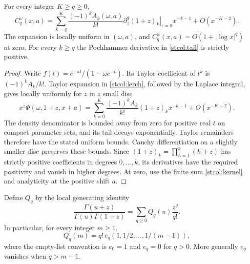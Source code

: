 \begin{lemma}\label{stcol:tail-lemma}
For every integer $K\ge q\ge0$,
\begin{equation}\label{stcol:tail}
 C_q^\omega(x,a)
 =\sum_{k=q}^K\frac{(-1)^kA_k(\omega,a)}{k!}
       \left.\partial_z^q(1+z)_k\right|_{z=0}x^{-k-1}
       +O(x^{-K-2}).
\end{equation}
The expansion is locally uniform in $(\omega,a)$, and
$C_q^\omega(x,a)=O(1+|\log x|^q)$ at zero.  For every $k\ge q$ the
Pochhammer derivative in \eqref{stcol:tail} is strictly positive.
\end{lemma}
\begin{proof}
Write $f(t)=e^{-at}/(1-\omega e^{-t})$.  Its Taylor coefficient of
$t^k$ is $(-1)^kA_k/k!$.  Taylor expansion in
\eqref{stcol:lerch}, followed by the Laplace integral, gives locally
uniformly for $z$ in a small disc
\[
 x^z\Phi(\omega,1+z,x+a)
   =\sum_{k=0}^K\frac{(-1)^kA_k}{k!}(1+z)_k x^{-k-1}
     +O(x^{-K-2}).
\]
The density denominator is bounded away from zero for positive real
$t$ on compact parameter sets, and its tail decays exponentially.
Taylor remainders therefore have the stated uniform bounds.
Cauchy differentiation on a slightly smaller disc preserves these
bounds.  Since $(1+z)_k=\prod_{h=1}^k(h+z)$ has strictly positive
coefficients in degrees $0,\ldots,k$, its derivatives have the required
positivity and vanish in higher degrees.  At zero, use the finite
sum \eqref{stcol:kernel} and analyticity at the positive shift $a$.
\end{proof}

Define $Q_q$ by the local generating identity
\begin{equation}\label{stcol:Q}
 \frac{\Gamma(u+z)}{\Gamma(u)\Gamma(1+z)}
       =\sum_{q\ge0}Q_q(u)\frac{z^q}{q!}.
\end{equation}
In particular, for every integer $m\ge1$,
\begin{equation}\label{stcol:Q-integer}
 Q_q(m)=q!\,e_q(1,1/2,\ldots,1/(m-1)),
\end{equation}
where the empty-list convention is $e_0=1$ and $e_q=0$ for $q>0$.
More generally $e_q$ vanishes when $q>m-1$.

